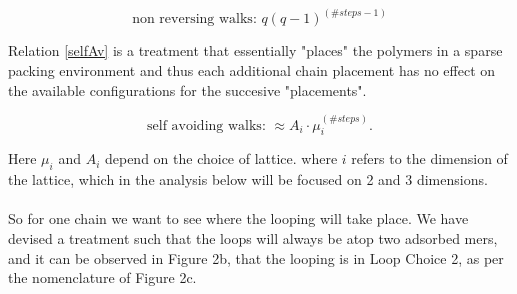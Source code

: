 \documentclass[10pt,letterpaper]{article}
\begin{document}
\begin{equation}
    \boxed{
	    \text{non reversing walks:  } q(q-1)^{(\#steps-1)}
	 }
	\label{nonRev}
\end{equation}

\noindent Relation \ref{selfAv} is a treatment that essentially "places" the polymers in a sparse packing environment and thus each additional chain placement has no effect on the available configurations for the succesive "placements".

\begin{equation}
    \boxed{
	    \text{self avoiding walks:  } \approx A_i\cdot\mu_i^{(\#steps)}.
    }
	\label{selfAv}
\end{equation}


\noindent Here $\mu_i$ and $A_i$ depend on the choice of lattice\cite{Chen2002,Madras2013}. where $i$ refers to the dimension of the lattice, which in the analysis below will be focused on 2 and 3 dimensions.\\\\

\noindent So for one chain we want to see where the looping will take place. We have devised a treatment such that the loops will always be atop two adsorbed mers, and it can be observed in Figure 2b, that the looping is in Loop Choice 2, as per the nomenclature of Figure 2c.
\end{document}
